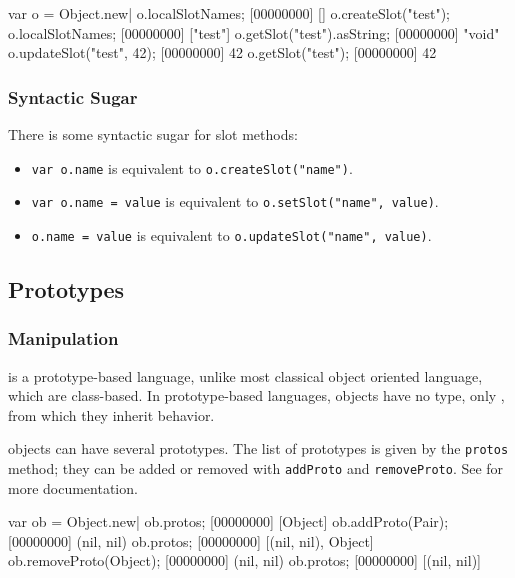 \begin{urbiscript}[firstnumber=last]
var o = Object.new|
o.localSlotNames;
[00000000] []
o.createSlot("test");
o.localSlotNames;
[00000000] ["test"]
o.getSlot("test").asString;
[00000000] "void"
o.updateSlot("test", 42);
[00000000] 42
o.getSlot("test");
[00000000] 42
\end{urbiscript}

\subsubsection{Syntactic Sugar}

There is some syntactic sugar for slot methods:
\begin{itemize}
\item \lstinline|var o.name| is equivalent to
  \lstinline|o.createSlot("name")|.
\item \lstinline|var o.name = value| is equivalent to
  \lstinline|o.setSlot("name", value)|.
\item \lstinline|o.name = value| is equivalent to
  \lstinline|o.updateSlot("name", value)|.
\end{itemize}


\subsection{Prototypes}

\subsubsection{Manipulation}

\us is a prototype-based language, unlike most classical object
oriented language, which are class-based. In prototype-based
languages, objects have no type, only , from which they
inherit behavior.

\us objects can have several prototypes. The list of prototypes is
given by the \lstinline|protos| method; they can be added or removed
with \lstinline|addProto| and \lstinline|removeProto|.  See
 for more documentation.

\begin{urbiscript}[firstnumber=last]
var ob = Object.new|
ob.protos;
[00000000] [Object]
ob.addProto(Pair);
[00000000] (nil, nil)
ob.protos;
[00000000] [(nil, nil), Object]
ob.removeProto(Object);
[00000000] (nil, nil)
ob.protos;
[00000000] [(nil, nil)]
\end{urbiscript}


